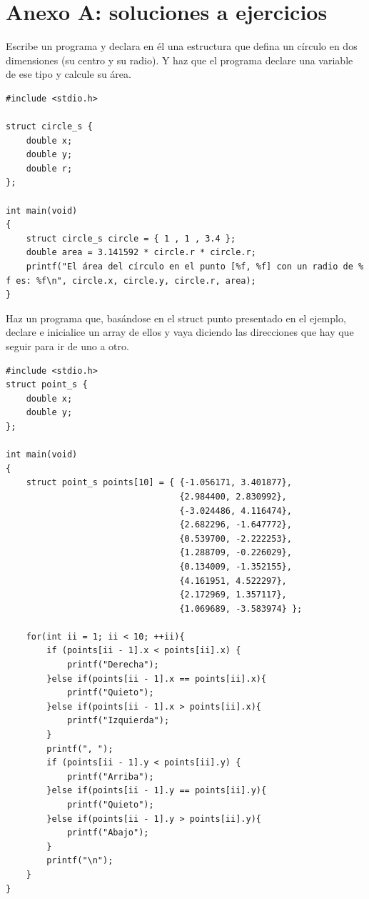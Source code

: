 \documentclass[a4paper]{article}
\begin{document}
\section{Anexo A: soluciones a ejercicios}
\begin{exercises}
\item Escribe un programa y declara en él una estructura que defina un círculo
en dos dimensiones (su centro y su radio). Y haz que el programa declare una
variable de ese tipo y calcule su área.


\noindent
\begin{minipage}[H]{\linewidth}
\mbox{}
\begin{lstlisting}[style=C,
caption={Solución al ejercicio 1},
label={lst:solution1}]
#include <stdio.h>

struct circle_s {
    double x;
    double y;
    double r;
};

int main(void)
{
    struct circle_s circle = { 1 , 1 , 3.4 };
    double area = 3.141592 * circle.r * circle.r;
    printf("El área del círculo en el punto [%f, %f] con un radio de % f es: %f\n", circle.x, circle.y, circle.r, area);
}
\end{lstlisting}
\end{minipage}

\item Haz un programa que, basándose en el struct punto presentado en el
ejemplo, declare e inicialice un array de ellos y vaya diciendo las direcciones
que hay que seguir para ir de uno a otro.


\noindent
\begin{minipage}[H]{\linewidth}
\mbox{}
\begin{lstlisting}[style=C,
caption={Solución al ejercicio 2},
label={lst:solution2}]
#include <stdio.h>
struct point_s {
    double x;
    double y;
};

int main(void)
{
    struct point_s points[10] = { {-1.056171, 3.401877},
                                  {2.984400, 2.830992},
                                  {-3.024486, 4.116474},
                                  {2.682296, -1.647772},
                                  {0.539700, -2.222253},
                                  {1.288709, -0.226029},
                                  {0.134009, -1.352155},
                                  {4.161951, 4.522297},
                                  {2.172969, 1.357117},
                                  {1.069689, -3.583974} };

    for(int ii = 1; ii < 10; ++ii){
        if (points[ii - 1].x < points[ii].x) {
            printf("Derecha");
        }else if(points[ii - 1].x == points[ii].x){
            printf("Quieto");
        }else if(points[ii - 1].x > points[ii].x){
            printf("Izquierda");
        }
        printf(", ");
        if (points[ii - 1].y < points[ii].y) {
            printf("Arriba");
        }else if(points[ii - 1].y == points[ii].y){
            printf("Quieto");
        }else if(points[ii - 1].y > points[ii].y){
            printf("Abajo");
        }
        printf("\n");
    }
}
\end{lstlisting}
\end{minipage}


\end{exercises}
\end{document}

